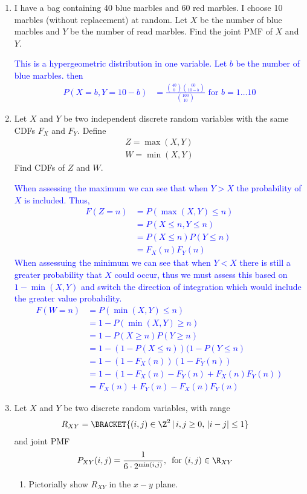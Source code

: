 \documentclass[10pt,a4paper]{report}
\newcommand{\BLUE}[1]{\textcolor{blue}{#1}}
\begin{document}
\begin{enumerate}
	\item I have a bag containing 40 blue marbles and 60 red marbles.  I choose 10 marbles (without replacement) at random.  Let $X$ be the number of blue marbles and $Y$ be the number of read marbles.  Find the joint PMF of $X$ and $Y$.
	
	\BLUE{This is a hypergeometric distribution in one variable.  Let $b$ be the number of blue marbles. then
	\begin{align*}
		P(X=b, Y=10-b) &= \frac{\binom{40}{b}\binom{60}{10-b}}{\binom{100}{10}} \text{ for } b=1\dots 10
	\end{align*}
	}
	
	\item Let $X$ and $Y$ be two independent discrete random variables with the same CDFs $F_X$ and $F_Y$.  Define 
	\begin{align*}
		Z = \max(X,Y)\\
		W = \min(X,Y)
	\end{align*}Find CDFs of $Z$ and $W$.
	
	\BLUE{When assessing the maximum we can see that when $Y > X$ the probability of $X$ is included. Thus,
	\begin{align*}
		F(Z=n) &= P(\max(X,Y)\le n) \\
			&= P(X \le n, Y \le n) \\
			&= P(X \le n)P(Y \le n) \\
			&= F_X(n)F_Y(n)
	\end{align*}When assessuing the minimum we can see that when $Y < X$ there is still a greater probability that $X$ could occur, thus we must assess this based on $1-\min(X,Y)$ and switch the direction of integration which would include the greater value probability.
	\begin{align*}
		F(W = n) &= P(\min(X,Y)\le n) \\
			&= 1-P(\min(X,Y)\ge n) \\
			&= 1-P(X\ge n)P(Y\ge n) \\
			&= 1-(1-P(X\le n))(1-P(Y\le n) \\
			&= 1-(1-F_X(n))(1-F_Y(n)) \\
			&= 1-(1-F_X(n)-F_Y(n)+F_X(n)F_Y(n))\\
			&= F_X(n)+F_Y(n)-F_X(n)F_Y(n)
	\end{align*}
	}
	
	\item Let $X$ and $Y$ be two discrete random variables, with range
	\begin{align*}
		R_{XY} &= \BRACKET{(i,j) \in \Z^2\,|\,i,j \ge 0,\, |i-j|\le 1}
	\end{align*} and joint PMF
	\begin{align*}
		P_{XY}(i,j) &= \frac{1}{6\cdot 2^{\min(i,j)}},\, \text{ for }(i,j) \in \R_{XY}
	\end{align*}
	\begin{enumerate}
		\item Pictorially show $R_{XY}$ in the $x-y$ plane.
		

\end{enumerate}
\end{enumerate}
\end{document}
